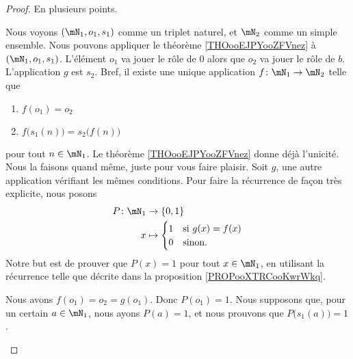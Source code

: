 \begin{proof}
	En plusieurs points.
	\begin{subproof}
		\spitem[Existence]
		Nous voyons \( (\mN_1, o_1, s_1)\) comme un triplet naturel, et \( \mN_2\) comme un simple ensemble. Nous pouvons appliquer le théorème \ref{THOooEJPYooZFVnez} à \( (\mN_1, o_1, s_1)\). L'élément \( o_1\) va jouer le rôle de \( 0\) alors que \( o_2\) va jouer le rôle de \( b\). L'application \( g\) est \( s_2\). Bref, il existe une unique application \( f\colon \mN_1\to \mN_2\) telle que
		\begin{enumerate}
			\item
			      \( f(o_1)=o_2\)
			\item
			      \( f\big( s_1(n) \big)=s_2\big( f(n) \big)\)
		\end{enumerate}
		pour tout \( n\in \mN_1\).
		\spitem[Unicité]
		Le théorème \ref{THOooEJPYooZFVnez} donne déjà l'unicité. Nous la faisons quand même, juste pour vous faire plaisir. Soit \( g\), une autre application vérifiant les mêmes conditions. Pour faire la récurrence de façon très explicite, nous posons
		\begin{equation}
			\begin{aligned}
				P\colon \mN_1 & \to \{ 0,1 \}                    \\
				x             & \mapsto \begin{cases}
					                        1 & \text{si } g(x)=f(x) \\
					                        0 & \text{sinon. }
				                        \end{cases}
			\end{aligned}
		\end{equation}
		Notre but est de prouver que \( P(x)=1\) pour tout \( x\in \mN_1\), en utilisant la récurrence telle que décrite dans la proposition \ref{PROPooXTRCooKwrWkq}.

		Nous avons \( f(o_1)=o_2=g(o_1)\). Donc \( P(o_1)=1\). Nous supposons que, pour un certain \( a\in \mN_1\), nous ayons \( P(a)=1\), et nous prouvons que \( P\big( s_1(a) \big)=1\).


\end{subproof}
\end{proof}
